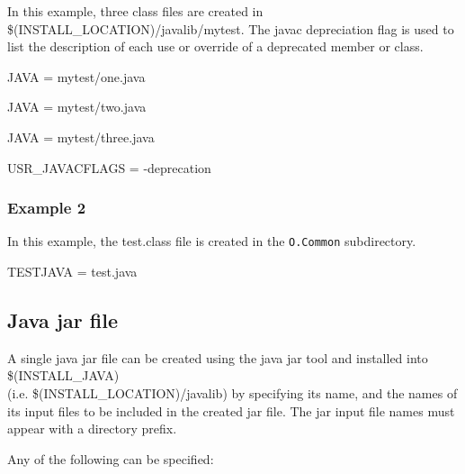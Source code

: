 In this example, three class files are created in \$(INSTALL\_LOCATION)/javalib/mytest. The javac depreciation flag is 
used to list the description of each use or override of a deprecated member or class.

\begin{description}

\item {}JAVA = mytest/one.java

\item JAVA = mytest/two.java

\item JAVA = mytest/three.java

\item {}USR\_JAVACFLAGS = -deprecation

\end{description}

\subsubsection{Example 2}

In this example, the test.class file is created in the \verb|O.Common| subdirectory.

\begin{description}

\item {}TESTJAVA = test.java

\end{description}

\subsection{Java jar file}

A single java jar file can be created using the java jar tool and installed into \$(INSTALL\_JAVA) \\
(i.e. \$(INSTALL\_LOCATION)/javalib) by specifying its name, and the names of its input files to be included in the created jar 
file. The jar input file names must appear with a directory prefix.

Any of the following can be specified:

